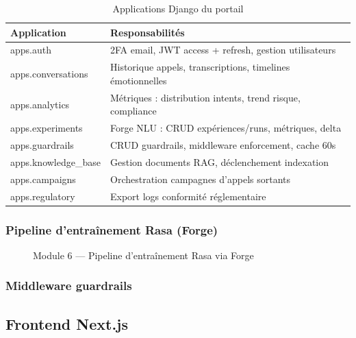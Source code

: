 \begin{table}[H]
  \centering
  \caption{Applications Django du portail}
  \label{tab:django_apps}
  \begin{tabularx}{\textwidth}{lX}
    \toprule
    \textbf{Application} & \textbf{Responsabilités} \\
    \midrule
    apps.auth          & 2FA email, JWT access + refresh, gestion utilisateurs \\
    apps.conversations  & Historique appels, transcriptions, timelines émotionnelles \\
    apps.analytics     & Métriques : distribution intents, trend risque, compliance \\
    apps.experiments   & Forge NLU : CRUD expériences/runs, métriques, delta \\
    apps.guardrails    & CRUD guardrails, middleware enforcement, cache 60s \\
    apps.knowledge\_base & Gestion documents RAG, déclenchement indexation \\
    apps.campaigns     & Orchestration campagnes d'appels sortants \\
    apps.regulatory    & Export logs conformité réglementaire \\
    \bottomrule
  \end{tabularx}
\end{table}

\subsubsection{Pipeline d'entraînement Rasa (Forge)}

\begin{figure}[H]
  \centering
  
  \caption{Module 6 — Pipeline d'entraînement Rasa via Forge}
  \label{fig:m6_training}
\end{figure}

\subsubsection{Middleware guardrails}


\subsection{Frontend Next.js}


